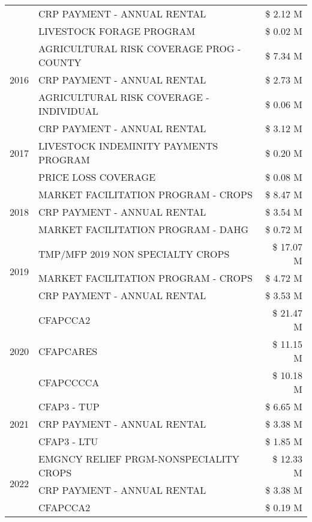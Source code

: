 \begin{tabular}{llr}
 & CRP PAYMENT - ANNUAL RENTAL & \$ 2.12 M \\
 & LIVESTOCK FORAGE PROGRAM & \$ 0.02 M \\
\cline{1-3}
\multirow[t]{3}{*}{2016} & AGRICULTURAL RISK COVERAGE PROG - COUNTY & \$ 7.34 M \\
 & CRP PAYMENT - ANNUAL RENTAL & \$ 2.73 M \\
 & AGRICULTURAL RISK COVERAGE - INDIVIDUAL & \$ 0.06 M \\
\cline{1-3}
\multirow[t]{3}{*}{2017} & CRP PAYMENT - ANNUAL RENTAL & \$ 3.12 M \\
 & LIVESTOCK INDEMINITY PAYMENTS PROGRAM & \$ 0.20 M \\
 & PRICE LOSS COVERAGE & \$ 0.08 M \\
\cline{1-3}
\multirow[t]{3}{*}{2018} & MARKET FACILITATION PROGRAM - CROPS & \$ 8.47 M \\
 & CRP PAYMENT - ANNUAL RENTAL & \$ 3.54 M \\
 & MARKET FACILITATION PROGRAM - DAHG & \$ 0.72 M \\
\cline{1-3}
\multirow[t]{3}{*}{2019} & TMP/MFP 2019 NON SPECIALTY CROPS & \$ 17.07 M \\
 & MARKET FACILITATION PROGRAM - CROPS & \$ 4.72 M \\
 & CRP PAYMENT - ANNUAL RENTAL & \$ 3.53 M \\
\cline{1-3}
\multirow[t]{3}{*}{2020} & CFAPCCA2 & \$ 21.47 M \\
 & CFAPCARES & \$ 11.15 M \\
 & CFAPCCCCA & \$ 10.18 M \\
\cline{1-3}
\multirow[t]{3}{*}{2021} & CFAP3 - TUP & \$ 6.65 M \\
 & CRP PAYMENT - ANNUAL RENTAL & \$ 3.38 M \\
 & CFAP3 - LTU & \$ 1.85 M \\
\cline{1-3}
\multirow[t]{3}{*}{2022} & EMGNCY RELIEF PRGM-NONSPECIALITY CROPS & \$ 12.33 M \\
 & CRP PAYMENT - ANNUAL RENTAL & \$ 3.38 M \\
 & CFAPCCA2 & \$ 0.19 M \\
\cline{1-3}
\bottomrule
\end{tabular}
